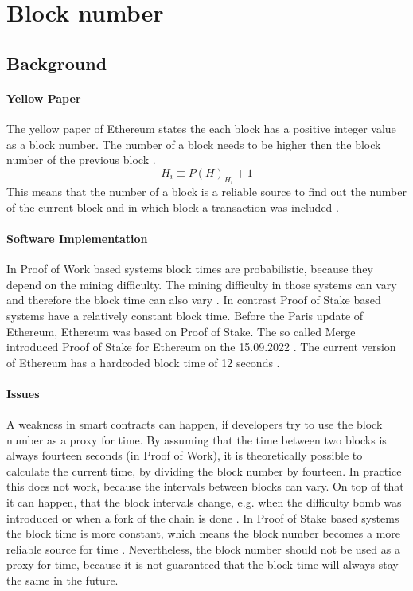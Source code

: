 \section{Block number}

\subsection{Background}

\paragraph{Yellow Paper}
The yellow paper of Ethereum states the each block has a positive integer value as a block number.
The number of a block needs to be higher then the block number of the previous block \cite{ethyellowpaper2023}.
\begin{equation} \label{eq:blocknumber}
    H_i \equiv P(H)_{H_i} + 1
\end{equation}
This means that the number of a block is a reliable source to find out 
the number of the current block and in which block a transaction was included \cite{eth_blocks}.

\paragraph{Software Implementation}
In Proof of Work based systems block times are probabilistic, because they depend on the mining difficulty.
The mining difficulty in those systems can vary and therefore the block time can also vary \cite{eth_blocks}. \newline
In contrast Proof of Stake based systems have a relatively constant block time.
Before the Paris update of Ethereum, Ethereum was based on Proof of Stake. The so called Merge introduced Proof of Stake for Ethereum
on the 15.09.2022 \cite{eth_history}. The current version of Ethereum has a hardcoded block time of 12 seconds \cite{eth_blocks}. \newline

\paragraph{Issues}
A weakness in smart contracts can happen, if developers try to use the block number as a proxy for time.
By assuming that the time between two blocks is always fourteen seconds (in Proof of Work), it is theoretically possible to
calculate the current time, by dividing the block number by fourteen. In practice this does not work,
because the intervals between blocks can vary. On top of that it can happen, that the
block intervals change, e.g. when the difficulty bomb was introduced or when a fork of the chain is done \cite{swc116}. \newline
In Proof of Stake based systems the block time is more constant, which means the block number becomes a more reliable source for time \cite{bellatrix_specs}.
Nevertheless, the block number should not be used as a proxy for time, because it is not guaranteed that the block time will always stay the same in the future.	

